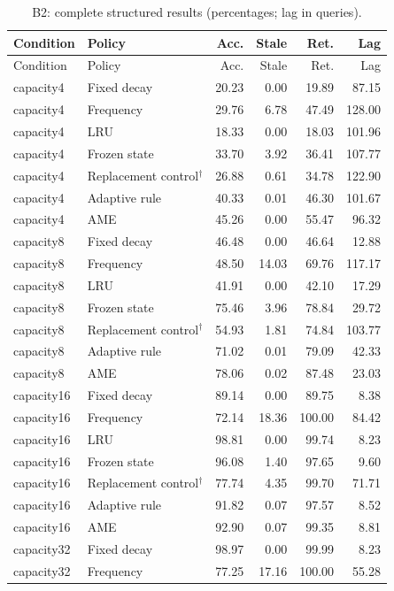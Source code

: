 \begin{longtable}{llrrrr}\caption{B2: complete structured results (percentages; lag in queries).}\label{tab:B2}\\\toprule Condition & Policy & Acc. & Stale & Ret. & Lag\\\midrule\endfirsthead\toprule Condition & Policy & Acc. & Stale & Ret. & Lag\\\midrule\endhead
capacity4 & Fixed decay & 20.23 & 0.00 & 19.89 & 87.15\\
capacity4 & Frequency & 29.76 & 6.78 & 47.49 & 128.00\\
capacity4 & LRU & 18.33 & 0.00 & 18.03 & 101.96\\
capacity4 & Frozen state & 33.70 & 3.92 & 36.41 & 107.77\\
capacity4 & Replacement control$^{\dagger}$ & 26.88 & 0.61 & 34.78 & 122.90\\
capacity4 & Adaptive rule & 40.33 & 0.01 & 46.30 & 101.67\\
capacity4 & AME & 45.26 & 0.00 & 55.47 & 96.32\\
capacity8 & Fixed decay & 46.48 & 0.00 & 46.64 & 12.88\\
capacity8 & Frequency & 48.50 & 14.03 & 69.76 & 117.17\\
capacity8 & LRU & 41.91 & 0.00 & 42.10 & 17.29\\
capacity8 & Frozen state & 75.46 & 3.96 & 78.84 & 29.72\\
capacity8 & Replacement control$^{\dagger}$ & 54.93 & 1.81 & 74.84 & 103.77\\
capacity8 & Adaptive rule & 71.02 & 0.01 & 79.09 & 42.33\\
capacity8 & AME & 78.06 & 0.02 & 87.48 & 23.03\\
capacity16 & Fixed decay & 89.14 & 0.00 & 89.75 & 8.38\\
capacity16 & Frequency & 72.14 & 18.36 & 100.00 & 84.42\\
capacity16 & LRU & 98.81 & 0.00 & 99.74 & 8.23\\
capacity16 & Frozen state & 96.08 & 1.40 & 97.65 & 9.60\\
capacity16 & Replacement control$^{\dagger}$ & 77.74 & 4.35 & 99.70 & 71.71\\
capacity16 & Adaptive rule & 91.82 & 0.07 & 97.57 & 8.52\\
capacity16 & AME & 92.90 & 0.07 & 99.35 & 8.81\\
capacity32 & Fixed decay & 98.97 & 0.00 & 99.99 & 8.23\\
capacity32 & Frequency & 77.25 & 17.16 & 100.00 & 55.28\\

\end{longtable}
